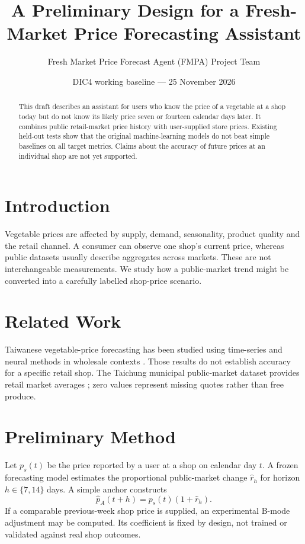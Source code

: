 \documentclass[11pt,a4paper]{article}
\title{A Preliminary Design for a Fresh-Market Price Forecasting Assistant}
\author{Fresh Market Price Forecast Agent (FMPA) Project Team}
\date{DIC4 working baseline --- 25 November 2026}
\begin{document}
\maketitle
\begin{abstract}
This draft describes an assistant for users who know the price of a vegetable at a shop today but do not know its likely price seven or fourteen calendar days later. It combines public retail-market price history with user-supplied store prices. Existing held-out tests show that the original machine-learning models do not beat simple baselines on all target metrics. Claims about the accuracy of future prices at an individual shop are not yet supported.
\end{abstract}

\section{Introduction}
Vegetable prices are affected by supply, demand, seasonality, product quality and the retail channel. A consumer can observe one shop's current price, whereas public datasets usually describe aggregates across markets. These are not interchangeable measurements. We study how a public-market trend might be converted into a carefully labelled shop-price scenario.

\section{Related Work}
Taiwanese vegetable-price forecasting has been studied using time-series and neural methods in wholesale contexts \cite{chen2024,lee2015}. Those results do not establish accuracy for a specific retail shop. The Taichung municipal public-market dataset provides retail market averages \cite{taichung84539}; zero values represent missing quotes rather than free produce.

\section{Preliminary Method}
Let \(p_s(t)\) be the price reported by a user at a shop on calendar day \(t\). A frozen forecasting model estimates the proportional public-market change \(\widehat r_h\) for horizon \(h\in\{7,14\}\) days. A simple anchor constructs
\begin{equation}
\widehat p_{A}(t+h)=p_s(t)(1+\widehat r_h).
\end{equation}
If a comparable previous-week shop price is supplied, an experimental B-mode adjustment may be computed. Its coefficient is fixed by design, not trained or validated against real shop outcomes.
\end{document}
